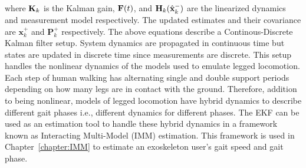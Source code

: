\noindent where $ \mathbf{K}_k $ is the Kalman gain, $ \mathbf{F}(t) $, and $ \mathbf{H}_k(\hat{\mathbf{x}}_k^-) $ are the linearized dynamics and measurement model respectively. The updated estimates and their covariance are $ \mathbf{x}_k^+ $ and $ \mathbf{P}_k^+ $ respectively. The above equations describe a Continous-Discrete Kalman filter setup. System dynamics are propagated in continuous time but states are updated in discrete time since measurements are discrete. This setup handles the nonlinear dynamics of the models used to emulate legged locomotion. Each step of human walking has alternating single and double support periods depending on how many legs are in contact with the ground. Therefore, addition to being nonlinear, models of legged locomotion have hybrid dynamics to describe different gait phases i.e., different dynamics for different phases. The EKF can be used as an estimation tool to handle these hybrid dynamics in a framework known as Interacting Multi-Model (IMM) estimation. This framework is used in Chapter~\ref{chapter:IMM} to estimate an exoskeleton user's gait speed and gait phase.